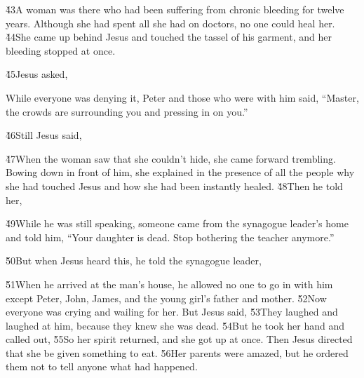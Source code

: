 \v{43}A woman was there who had been suffering from chronic bleeding for twelve years. Although she had spent all she had on doctors, no one could heal her. \v{44}She came up behind Jesus and touched the tassel of his garment, and her bleeding stopped at once.

\v{45}Jesus asked, 

While everyone was denying it, Peter and those who were with him said, ``Master, the crowds are surrounding you and pressing in on you.''

\v{46}Still Jesus said, 

\v{47}When the woman saw that she couldn't hide, she came forward trembling. Bowing down in front of him, she explained in the presence of all the people why she had touched Jesus and how she had been instantly healed. \v{48}Then he told her, 

\v{49}While he was still speaking, someone came from the synagogue leader's home and told him, ``Your daughter is dead. Stop bothering the teacher anymore.''

\v{50}But when Jesus heard this, he told the synagogue leader, 

\v{51}When he arrived at the man's house, he allowed no one to go in with him except Peter, John, James, and the young girl's father and mother. \v{52}Now everyone was crying and wailing for her. But Jesus said,  \v{53}They laughed and laughed at him, because they knew she was dead. \v{54}But he took her hand and called out,  \v{55}So her spirit returned, and she got up at once. Then Jesus directed that she be given something to eat. \v{56}Her parents were amazed, but he ordered them not to tell anyone what had happened.

